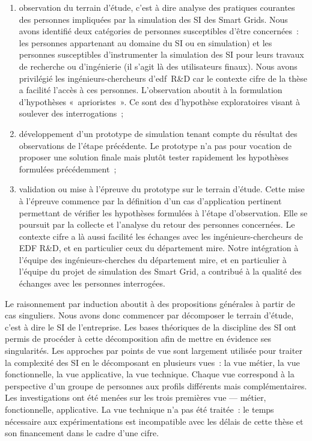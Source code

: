 		\begin{enumerate}
		
	\item observation du terrain d'étude, c'est à dire analyse des pratiques 
courantes des personnes impliquées par la simulation des SI des Smart Grids. Nous avons identifié deux 
catégories de personnes susceptibles d'être concernées~: les personnes appartenant au domaine du SI ou 
en simulation) et les personnes susceptibles d'instrumenter la simulation des SI 
pour leurs travaux de recherche ou d'ingénierie (il s'agit là des utilisateurs 
finaux). Nous avons privilégié les ingénieurs-chercheurs d'\gls{edf}~R\&D car le 
contexte \gls{cifre} de la thèse a facilité l'accès à ces 
personnes. L'observation aboutit à la formulation d'hypothèses «~aprioristes~». 
Ce sont des d'hypothèse exploratoires visant à soulever des interrogations~;

	
	\item développement d'un prototype de simulation tenant compte du résultat des 
observations de l'étape précédente. Le prototype n'a pas pour vocation de 
proposer une solution finale mais plutôt tester rapidement les hypothèses 
formulées précédemment~;
	
	\item validation ou mise à l'épreuve du prototype sur le terrain d'étude. Cette 
mise à l'épreuve commence par la définition d'un cas d'application pertinent 
permettant de vérifier les hypothèses formulées à l'étape d'observation. Elle se 
poursuit par la collecte et l'analyse du retour des personnes concernées. Le 
contexte \gls{cifre} a là aussi facilité les échanges avec les 
ingénieurs-chercheurs de EDF R\&D, et en particulier ceux du département 
\gls{mire}. Notre intégration à l'équipe des ingénieurs-cherches du département 
\gls{mire}, et en particulier à l'équipe du projet de simulation des Smart Grid, 
a contribué à la qualité des échanges avec les personnes interrogées.
	
		\end{enumerate}
		
	Le raisonnement par induction aboutit à des propositions générales à partir de 
cas singuliers. Nous avons donc commencer par décomposer le terrain d'étude, 
c'est à dire le SI de l'entreprise. Les bases théoriques de la discipline des SI 
ont permis de procéder à cette décomposition afin de mettre en évidence ses 
singularités. Les approches par points de vue sont largement utilisée pour 
traiter la complexité des SI en le décomposant en plusieurs vues~: la vue 
métier, la vue fonctionnelle, la vue applicative, la vue technique. Chaque vue 
correspond à la perspective d'un groupe de personnes aux profils différents mais 
complémentaires. Les investigations ont été menées sur les trois premières vue — 
métier, fonctionnelle, applicative. La vue technique n'a pas été traitée~: le 
temps nécessaire aux expérimentations est incompatible avec les délais de cette 
thèse et son financement dans le cadre d'une \gls{cifre}.
	
